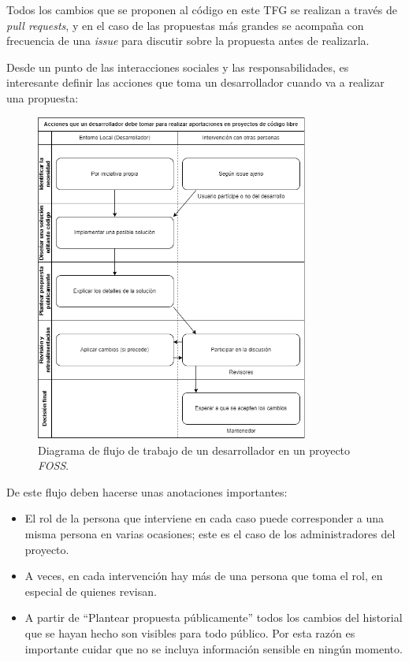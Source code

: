 Todos los cambios que se proponen al código en este TFG se realizan a través de \textit{pull requests}, y en el caso de las propuestas más grandes se acompaña con frecuencia de una \textit{\gls{issue}} para discutir sobre la propuesta antes de realizarla.

Desde un punto de las interacciones sociales y las responsabilidades, es interesante definir las acciones que toma un desarrollador cuando va a realizar una propuesta:

\begin{figure}[H]
    \centering
    \includegraphics[width=0.8\textwidth]{images/SoA_foss/Contrib_dev.png}
    \caption{Diagrama de flujo de trabajo de un desarrollador en un proyecto \textit{FOSS}.}
    \label{fig:FOSS_workflow}
\end{figure}

De este flujo deben hacerse unas anotaciones importantes:

\begin{itemize}
    \item El rol de la persona que interviene en cada caso puede corresponder a una misma persona en varias ocasiones; este es el caso de los administradores del proyecto.
    \item A veces, en cada intervención hay más de una persona que toma el rol, en especial de quienes revisan.
    \item A partir de ``Plantear propuesta públicamente'' todos los cambios del historial que se hayan hecho son visibles para todo público. Por esta razón es importante cuidar que no se incluya información sensible en ningún momento.
\end{itemize}

